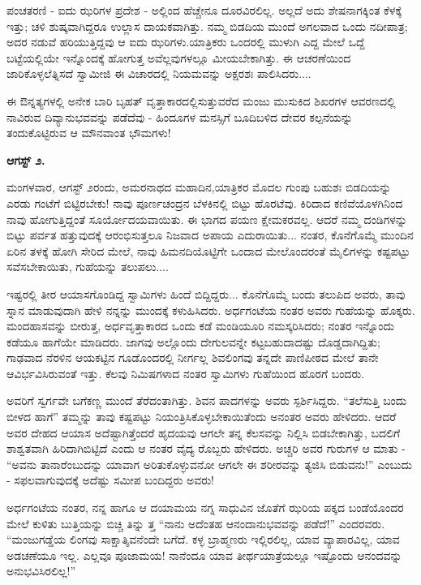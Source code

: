 ಪಂಚತರಣಿ - ಐದು ಝರಿಗಳ ಪ್ರದೇಶ - ಅಲ್ಲಿಂದ ಹೆಚ್ಚೇನೂ ದೂರವಿರಲಿಲ್ಲ. ಅಲ್ಲದೆ ಅದು ಶೇಷನಾಗಕ್ಕಿಂತ ಕೆಳಕ್ಕೆ ಇತ್ತು; ಚಳಿ ಶುಷ್ಕವಾಗಿದ್ದರೂ ಉಲ್ಲಾಸ ದಾಯಕವಾಗಿತ್ತು. ನಮ್ಮ ಬಿಡದಿಯ ಮುಂದೆ ಅಗಲವಾದ ಒಂದು ನದೀಪಾತ್ರ; ಅದರ ನಡುವೆ ಹರಿಯುತ್ತಿದ್ದವು ಆ ಐದು ಝರಿಗಳು.ಯಾತ್ರಿಕರು ಒಂದರಲ್ಲಿ ಮುಳುಗಿ ಎದ್ದ ಮೇಲೆ ಒದ್ದೆ ಬಟ್ಟೆಯಲ್ಲಿಯೇ ಇನ್ನೊಂದಕ್ಕೆ ಹೋಗುತ್ತ ಅವೆಲ್ಲವುಗಳಲ್ಲೂ ಮೀಯಬೇಕಾಗಿತ್ತು. ಈ ಆಚರಣೆಯಿಂದ ಜಾರಿಕೊಳ್ಳಲೆತ್ನಿಸದೆ ಸ್ವಾಮೀಜಿ ಈ ವಿಚಾರದಲ್ಲಿ ನಿಯಮವನ್ನು ಅಕ್ಷರಶಃ ಪಾಲಿಸಿದರು....

ಈ ಔನ್ನತ್ಯಗಳಲ್ಲಿ ಅನೇಕ ಬಾರಿ ಬೃಹತ್ ವೃತ್ತಾಕಾರದಲ್ಲಿಸುತ್ತುವರೆದ ಮಂಜು ಮುಸುಕಿದ ಶಿಖರಗಳ ಆವರಣದಲ್ಲಿ ನಾವಿರುವ ದಿವ್ಯಾನುಭವವನ್ನು ಪಡೆದೆವು - ಹಿಂದೂಗಳ ಮನಸ್ಸಿಗೆ ಬೂದಿಬಳಿದ ದೇವರ ಕಲ್ಪನೆಯನ್ನು ತಂದುಕೊಟ್ಟಿರುವ ಆ ಮೌನವಾಂತ ಭೌಮಗಳು!

\textbf{ಆಗಸ್ಟ್ ೨.}

ಮಂಗಳವಾರ, ಆಗಸ್ಟ್ ೨ರಂದು, ಅಮರನಾಥದ ಮಹಾದಿನ,ಯಾತ್ರಿಕರ ಮೊದಲ ಗುಂಪು ಬಹುಶಃ ಬಿಡದಿಯನ್ನು ಎರಡು ಗಂಟೆಗೆ ಬಿಟ್ಟಿರಬೇಕು! ನಾವು ಪೂರ್ಣಚಂದ್ರನ ಬೆಳಕಿನಲ್ಲಿ ಬಿಟ್ಟು ಹೊರಟೆವು. ಕಿರಿದಾದ ಕಣಿವೆಯೊಳಗಿನಿಂದ ನಾವು ಹೋಗುತ್ತಿದ್ದಂತೆ ಸೂರ್ಯೋದಯವಾಯಿತು. ಈ ಭಾಗದ ಪಯಣ ಕ್ಷೇಮಕರವಲ್ಲ. ಆದರೆ ನಮ್ಮ ದಂಡಿಗಳನ್ನು ಬಿಟ್ಟು ಪರ್ವತ ಹತ್ತುವುದಕ್ಕೆ ಆರಂಭಿಸುತ್ತಲೂ ನಿಜವಾದ ಅಪಾಯ ಎದುರಾಯಿತು... ನಂತರ, ಕೊನೆಗೊಮ್ಮೆ ಮುಂದಿನ ಏರಿನ ತಳಕ್ಕೆ ಹೋಗಿ ಸೇರಿದ ಮೇಲೆ, ನಾವು ಹಿಮನದಿಯೊಟ್ಟಿಗೇ ಒಂದಾದ ಮೇಲೊಂದರಂತೆ ಮೈಲಿಗಳನ್ನು ಕಷ್ಟಪಟ್ಟು ಸವೆಸಬೇಕಾಯಿತು, ಗುಹೆಯನ್ನು ತಲುಪಲು....

ಇಷ್ಟರಲ್ಲಿ ತೀರ ಆಯಾಸಗೊಂಡಿದ್ದ ಸ್ವಾಮಿಗಳು ಹಿಂದೆ ಬಿದ್ದಿದ್ದರು... ಕೊನೆಗೊಮ್ಮೆ ಬಂದು ತಲುಪಿದ ಅವರು, ತಾವು ಸ್ನಾನ ಮಾಡುವುದಾಗಿ ಹೇಳಿ ನನ್ನನ್ನು ಮುಂದಕ್ಕೆ ಕಳುಹಿಸಿದರು. ಅರ್ಧಗಂಟೆಯ ನಂತರ ಅವರು ಗುಹೆಯನ್ನು ಹೊಕ್ಕರು. ಮಂದಹಾಸವನ್ನು ಬೀರುತ್ತ, ಅರ್ಧವೃತ್ತಾಕಾರದ ಒಂದು ಕಡೆ ಮಂಡಿಯೂರಿ ನಮಸ್ಕರಿಸಿದರು; ನಂತರ ಇನ್ನೊಂದು ಕಡೆಯೂ ಹಾಗೆಯೇ ಮಾಡಿದರು. ಜಾಗವು ಅಲ್ಲೊಂದು ದೇಗುಲವನ್ನೇ ಕಟ್ಟಬಹುದಾದಷ್ಟು ದೊಡ್ಡದಾಗಿದ್ದಿತು; ಗಾಢವಾದ ನೆರಳಿನ ಆಯಕಟ್ಟಿನ ಗೂಡೊಂದರಲ್ಲಿ ನೀರ್ಗಲ್ಲ ಶಿವಲಿಂಗವು ತನ್ನದೇ ಪಾಣಿಪೀಠದ ಮೇಲೆ ತಾನೇ ಆವಿರ್ಭವಿಸಿರುವಂತೆ ಇತ್ತು. ಕೆಲವು ನಿಮಿಷಗಳಾದ ನಂತರ ಸ್ವಾಮಿಗಳು ಗುಹೆಯಿಂದ ಹೊರಗೆ ಬಂದರು.

ಅವರಿಗೆ ಸ್ವರ್ಗವೇ ಬಗೆಕಣ್ಣ ಮುಂದೆ ತೆರೆದಂತಾಗಿತ್ತು. ಶಿವನ ಪಾದಗಳನ್ನು ಅವರು ಸ್ಪರ್ಶಿಸಿದ್ದರು. “ತಲೆಸುತ್ತಿ ಬಂದು ಬೀಳದ ಹಾಗೆ” ತಮ್ಮನ್ನು ತಾವು ಕಷ್ಟಪಟ್ಟು ನಿಯಂತ್ರಿಸಿಕೊಳ್ಳಬೇಕಾಯಿತೆಂದು ಅನಂತರ ಅವರು ಹೇಳಿದರು. ಆದರೆ ಅವರ ದೇಹದ ಆಯಾಸ ಅದೆಷ್ಟಾಗಿತ್ತೆಂದರೆ ಹೃದಯವು ಆಗಲೇ ತನ್ನ ಕೆಲಸವನ್ನು ನಿಲ್ಲಿಸಿ ಬಿಡಬೇಕಾಗಿತ್ತು, ಬದಲಿಗೆ ಶಾಶ್ವತವಾಗಿ ಹಿರಿದಾಗಿಬಿಟ್ಟಿದೆ ಎಂದು ಆ ನಂತರ ವೈದ್ಯ ರೊಬ್ಬರು ಹೇಳಿದರು. ಅಚ್ಚರಿ ಅವರ ಗುರುಗಳ ಆ ಮಾತು - “ಅವನು ತಾನಾರೆಂಬುದನ್ನು ಯಾವಾಗ ಅರಿತುಕೊಳ್ಳುವನೋ ಆಗಲೇ ಈ ಶರೀರವನ್ನು ತ್ಯಜಿಸಿ ಬಿಡುವನು!” ಎಂಬುದು - ಸಫಲವಾಗುವುದಕ್ಕೆ ಅದೆಷ್ಟು ಸಮೀಪ ಬಂದಿದ್ದರು ಅವರು!

ಅರ್ಧಗಂಟೆಯ ನಂತರ, ನನ್ನ ಹಾಗೂ ಆ ದಯಾಮಯ ನಗ್ನ ಸಾಧುವಿನ ಜೊತೆಗೆ ಝರಿಯ ಪಕ್ಕದ ಬಂಡೆಯೊಂದರ ಮೇಲೆ ಕುಳಿತು ಬುತ್ತಿಯನ್ನು ಬಿಚ್ಚಿ ತಿನ್ನು ತ್ತ “ನಾನು ಅದೆಂತಹ ಆನಂದಾನುಭವವನ್ನು ಪಡೆದೆ!” ಎಂದರವರು. “ಮಂಜುಗಡ್ಡೆಯ ಲಿಂಗವು ಸಾಕ್ಷಾತ್ಶಿವನೆಂದೇ ಬಗೆದೆ. ಕಳ್ಳ ಬ್ರಾಹ್ಮಣರು ಇಲ್ಲಿರಲಿಲ್ಲ, ಯಾವ ವ್ಯಾಪಾರವಿಲ್ಲ, ಯಾವ ಅಡಚಣೆಯೂ ಇಲ್ಲ. ಎಲ್ಲವೂ ಪೂಜಾಮಯ! ನಾನೆಂದೂ ಯಾವ ತೀರ್ಥಯಾತ್ರೆಯಲ್ಲೂ ಇಷ್ಟೊಂದು ಆನಂದವನ್ನು ಅನುಭವಿಸಿರಲಿಲ್ಲ!”

